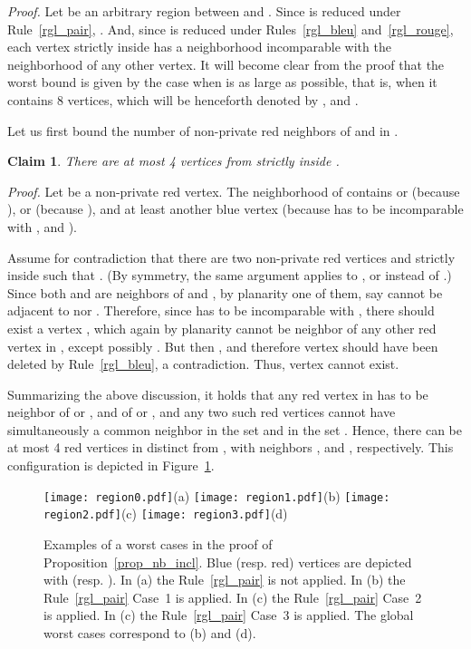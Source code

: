 \documentclass[a4paper,11pt]{article}
\newtheorem{claimN} {Claim}
\newcommand{\rrgl}   [1] {Rule~\ref{#1}\xspace}
\newenvironment{proof}{\noindent \textit{Proof. }}{\hfill\vspace{.2cm}}
\begin{document}
\begin{proof}
Let  be an arbitrary region between  and . Since  is reduced under \rrgl{rgl_pair}, . And, since  is reduced under Rules~\ref{rgl_bleu} and~\ref{rgl_rouge}, each vertex strictly inside  has a neighborhood incomparable with the neighborhood of any other vertex. It will become clear from the proof  that the worst bound is given by the case when  is as large as possible, that is, when it contains 8 vertices, which will be henceforth denoted by , and .

Let us first bound the number of non-private red neighbors of  and  in .

\begin{claimN}\label{fact:non-private}
There are at most 4 vertices from   strictly inside .
\end{claimN}
\begin{proof}
Let  be a non-private red vertex. The neighborhood of  contains  or  (because ),  or  (because ), and  at least another blue vertex (because  has to be incomparable with , and ).

Assume for contradiction that there are two non-private red vertices  and  strictly inside  such that . (By symmetry, the same argument applies to , or  instead of .) Since both  and  are neighbors of  and , by planarity one of them, say  cannot be adjacent to  nor . Therefore, since  has to be incomparable with , there should exist a vertex , which again by planarity cannot be neighbor of any other red vertex in , except possibly . But then , and therefore vertex  should have been deleted by Rule~\ref{rgl_bleu}, a contradiction. Thus, vertex  cannot exist.

Summarizing the above discussion, it holds that any red vertex in  has to be neighbor of  or , and of  or , and any two such red vertices  cannot have simultaneously a common neighbor in the set  and in the set . Hence, there can be at most 4 red vertices in  distinct from , with neighbors , and , respectively. This configuration is depicted in Figure~\ref{fig_region}.
\end{proof}


\begin{figure}[t]
\vspace{-1.0cm}
\begin{center}
   \texttt{[image: region0.pdf]}(a)
   \texttt{[image: region1.pdf]}(b)
   \texttt{[image: region2.pdf]}(c)
   \texttt{[image: region3.pdf]}(d)
\end{center}
\vspace{-.4cm}
   \caption{Examples of a worst cases in the proof of Proposition~\ref{prop_nb_incl}.
   Blue (resp. red) vertices are depicted with  (resp. \LARGE{}\normalsize{)}.
   In (a) the \rrgl{rgl_pair} is not applied.
   In (b) the \rrgl{rgl_pair} Case~1 is applied.
   In (c) the \rrgl{rgl_pair} Case~2 is applied.
   In (c) the \rrgl{rgl_pair} Case~3 is applied.
   The global worst cases correspond to (b) and (d).}
   \label{fig_region}
\end{figure}


\end{proof}
\end{document}

